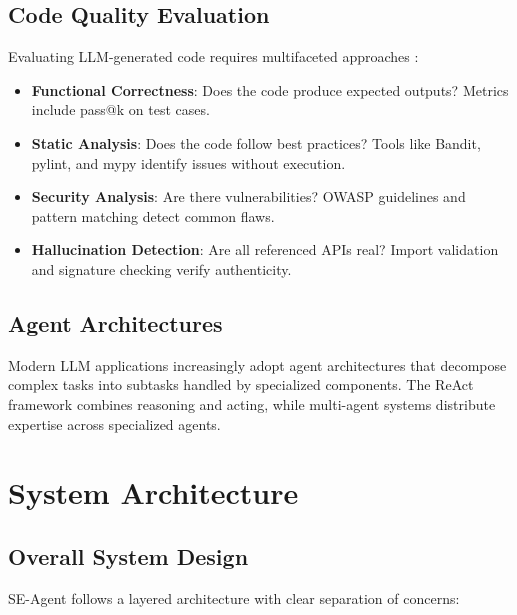\documentclass[12pt,a4paper]{article}
\begin{document}
\subsection{Code Quality Evaluation}

Evaluating LLM-generated code requires multifaceted approaches \cite{liu2023code}:

\begin{itemize}
    \item \textbf{Functional Correctness}: Does the code produce expected outputs? Metrics include pass@k on test cases.
    \item \textbf{Static Analysis}: Does the code follow best practices? Tools like Bandit, pylint, and mypy identify issues without execution.
    \item \textbf{Security Analysis}: Are there vulnerabilities? OWASP guidelines and pattern matching detect common flaws.
    \item \textbf{Hallucination Detection}: Are all referenced APIs real? Import validation and signature checking verify authenticity.
\end{itemize}

\subsection{Agent Architectures}

Modern LLM applications increasingly adopt agent architectures that decompose complex tasks into subtasks handled by specialized components. The ReAct framework \cite{yao2023react} combines reasoning and acting, while multi-agent systems distribute expertise across specialized agents.

\section{System Architecture}

\subsection{Overall System Design}

SE-Agent follows a layered architecture with clear separation of concerns:
\end{document}

